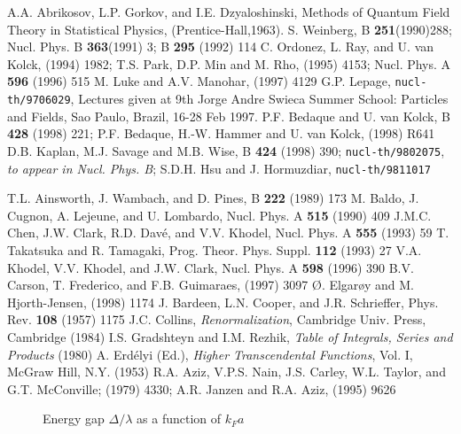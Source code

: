 \begin{references}
A.A. Abrikosov, L.P. Gorkov, and I.E. Dzyaloshinski,
Methods of Quantum Field Theory in Statistical Physics, (Prentice-Hall,1963).
%
S. Weinberg, \pl B {\bf 251}(1990)288; 
Nucl. Phys. B {\bf 363}(1991) 3; \pl B {\bf 295} (1992) 114
%
C. Ordonez, L. Ray, and U. van Kolck, 
 (1994) 1982; 
%
T.S. Park, D.P. Min and M. Rho, 
 (1995) 4153; Nucl. Phys. A {\bf 596} (1996) 515
%
M. Luke and A.V. Manohar,  (1997) 4129
%
G.P. Lepage, {\tt nucl-th/9706029}, Lectures given at 9th
Jorge Andre Swieca Summer School: Particles and Fields, Sao Paulo, Brazil,
16-28 Feb 1997.
%
P.F. Bedaque and U. van Kolck,
\pl B {\bf 428} (1998) 221; 
P.F. Bedaque, H.-W. Hammer and U. van Kolck, 
  (1998) R641
%
D.B. Kaplan, M.J. Savage and M.B. Wise, 
\pl B {\bf 424} (1998) 390;
{\tt nucl-th/9802075}, {\it to appear in Nucl. Phys. B};
%
S.D.H. Hsu and J. Hormuzdiar,
{\tt nucl-th/9811017}

T.L. Ainsworth, J. Wambach, and D. Pines,
\pl B {\bf 222} (1989) 173
%
M. Baldo, J. Cugnon, A. Lejeune, and U. Lombardo, 
Nucl. Phys. A {\bf 515} (1990) 409
%
J.M.C. Chen, J.W. Clark, R.D. Dav{\'e}, and V.V. Khodel,
Nucl. Phys. A {\bf 555} (1993) 59
%
T. Takatsuka and R. Tamagaki, 
Prog. Theor. Phys. Suppl. {\bf 112} (1993) 27
%
V.A. Khodel, V.V. Khodel, and J.W. Clark, 
Nucl. Phys. A {\bf 598} (1996) 390
%
B.V. Carson, T. Frederico, and F.B. Guimaraes,
 (1997) 3097
%
\O. Elgar{\o}y and M. Hjorth-Jensen,
 (1998) 1174
%
J. Bardeen, L.N. Cooper, and J.R. Schrieffer,
Phys. Rev. {\bf 108} (1957) 1175
%
J.C. Collins,
{\it Renormalization},
Cambridge Univ. Press, Cambridge (1984)
%
I.S. Gradshteyn and I.M. Rezhik,
{\it Table of Integrals, Series and Products}
(1980)
%
A. Erd{\'e}lyi (Ed.),
{\it Higher Transcendental Functions}, Vol. I, McGraw Hill, N.Y. (1953) 
%
 R.A. Aziz, V.P.S. Nain, J.S. Carley, W.L. Taylor, 
and G.T. McConville; 
 (1979) 4330;
A.R. Janzen and R.A. Aziz,
 (1995)  9626
%
\end{references}


\begin{figure}
  \begin{center}
    \leavevmode
    \parbox{0.9\textwidth}
           {}
  \end{center}
\protect\caption{Energy gap $\Delta/\lambda$ as a function of $k_F a$}
\label{fig1}
\end{figure}



